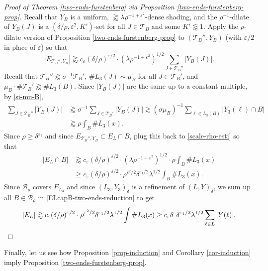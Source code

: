 \documentclass{amsart}
\numberwithin{equation}{section}
\newcommand{\de}{\delta}
\newcommand{\e}{\varepsilon}
\newcommand{\la}{\lambda}
\newcommand{\si}{\sigma}
\newcommand{\cb}{\mathcal B}
\newcommand{\cT}{{\mathcal T}}
\begin{document}
\begin{proof}[Proof of Theorem \ref{two-ends-furstenberg} via Proposition \ref{two-ends-furstenberg-prop}]
Recall that $Y_B$ is a uniform, $\gtrapprox\la\rho^{-1+\e^2}$-dense shading, and the $\rho^{-1}$-dilate of $Y_B(J)$ is a $(\de/\rho,\e^2, K')$-set for all $J\in\cT_B$ and some $K'\lessapprox1$.
Apply the $\rho$-dilate version of Proposition \ref{two-ends-furstenberg-prop} to $(\cT_B'',Y_B)$ (with $\e/2$ in place of $\e$) so that
\begin{equation}
\label{scale-rho-esti}
    |E_{\cT_B'',Y_B}|\gtrapprox c_{\e}(\delta/\rho)^{\e/2}\cdot (\lambda \rho^{-1+\e^2})^{1/2}\sum_{J\in\cT_B''}|Y_B(J)|. 
\end{equation}
Recall that $\cT_B''\gtrapprox\si^{-1}\cT_B'$, $\#L_3(J)\sim\mu_B$ for all $J\in\cT_B'$, and $\mu_B\cdot \#\cT_B'\gtrapprox \#L_3(B)$.
Since $|Y_B(J)|$ are the same up to a constant multiple, by \eqref{si-mu-B},
\begin{align}
    \sum_{J\in\cT_B''}|Y_B(J)|&\gtrapprox\si^{-1}\sum_{J\in\cT_B'}|Y_B(J)|\gtrsim(\si\mu_B)^{-1}\sum_{\ell\in L_3(B)}|Y_3(\ell)\cap B|\\
    &\gtrapprox\rho\int_B\#L_3(x).
\end{align}
Since $\rho\geq\de^{\e_1}$ and since $E_{\cT_B'',Y_B}\subset E_L\cap B$, plug this back to \eqref{scale-rho-esti} so that
\begin{align}
\label{ELcapB-two-ends-reduction}
    |E_L\cap B|&\gtrapprox  c_{\e}(\delta/\rho)^{\e/2} \cdot (\lambda \rho^{-1 +\e^2})^{1/2}\cdot\rho\int_B\#L_3(x)\\
    &\geq c_{\e}(\delta/\rho)^{\e/2}   \cdot    \rho^{\e^2/2}\de^{\e_1/2}\la^{1/2}\int_B\#L_3(x).
\end{align}
Since $\cb_\rho$ covers $E_{L_3}$ and since $(L_3,Y_3)_\de$ is a refinement of $(L,Y)_\de$, we sum up all $B\in\cb_\rho$ in \eqref{ELcapB-two-ends-reduction} to get
\begin{equation}
    |E_L|\gtrapprox  c_{\e}(\delta/\rho)^{\e/2}   \cdot    \rho^{\e^2/2} \de^{\e_1/2}\la^{1/2}\int\#L_3(x)\geq c_\e\de^{\e}\de^{\e_1/2}\la^{1/2}\sum_{\ell\in L}|Y(\ell)|. \qedhere
\end{equation}

\end{proof}

\smallskip

Finally, let us see how Proposition \ref{prop-induction} and Corollary \ref{cor-induction} imply Proposition \ref{two-ends-furstenberg-prop}. 

\bigskip
\end{document}
